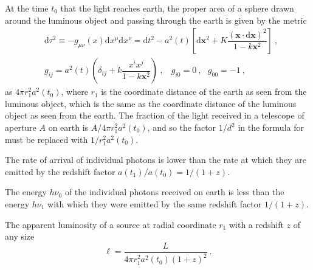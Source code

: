 \documentclass[12pt,a4paper]{article}
\renewcommand{\vec}[1]{\boldsymbol{#1}}
\newcommand{\dif}{\mathrm{d}}
\begin{document}
\cite{2008cosm.book.....W} At the time $t_0$ that the light reaches earth, the proper area of a sphere drawn around the luminous object and passing through the earth is given by the metric
\begin{align}
\nonumber & \dif \tau^2 \equiv -g_{\mu \nu}(x) \dif x^\mu \dif x^\nu = \dif t^2 -a^2(t) \left[\dif \vec{x}^2 +K \dfrac{(\vec{x} \cdot \dif \vec{x})^2}{1-k \vec{x}^2 }  \right] ~, \\
\nonumber & g_{ij} = a^2(t) \left(\delta_{ij} +k \dfrac{x^i x^j}{1-k \vec{x}^2} \right) ~, ~~~~ g_{i0} = 0 ~, ~~~ g_{00} = -1 ~,
\end{align}
as $4 \pi r_1^2 a^2(t_0)$, where $r_1$ is the coordinate distance of the earth as seen from the luminous object, which is the same as the coordinate distance of the luminous object as seen from the earth. The fraction of the light received in a telescope of aperture $A$ on earth is $A/4\pi r_1^2 a^2(t_0)$, and so the factor $1/d^2$ in the formula for must be replaced with $1/r_1^2 a^2(t_0)$.

The rate of arrival of individual photons is lower than the rate at which they are emitted by the redshift factor $a(t_1)/a(t_0) = 1/(1+z)$.

The energy $h\nu_0$ of the individual photons received on earth is less than the energy $h \nu_1$ with which they were emitted by the same redshift factor $1/(1+z)$.

The apparent luminosity of a source at radial coordinate $r_1$ with a redshift $z$ of any size
\begin{equation}
\ell =\dfrac{L}{4\pi r_1^2 a^2(t_0) (1+z)^2 } ~.
\end{equation}
\end{document}
